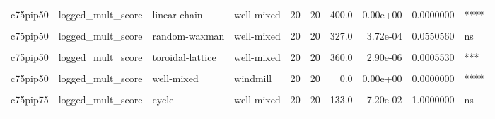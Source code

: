 \documentclass[
]{book}
\begin{document}
\begin{table}
\begin{tabular}{l|l|l|l|r|r|r|r|r|l}
\hline
\cellcolor{gray!6}{c75pip50} & \cellcolor{gray!6}{logged\_mult\_score} & \cellcolor{gray!6}{cycle} & \cellcolor{gray!6}{well-mixed} & \cellcolor{gray!6}{20} & \cellcolor{gray!6}{20} & \cellcolor{gray!6}{400.0} & \cellcolor{gray!6}{0.00e+00} & \cellcolor{gray!6}{0.0000000} & \cellcolor{gray!6}{****}\\
\hline
c75pip50 & logged\_mult\_score & linear-chain & well-mixed & 20 & 20 & 400.0 & 0.00e+00 & 0.0000000 & ****\\
\hline
\cellcolor{gray!6}{c75pip50} & \cellcolor{gray!6}{logged\_mult\_score} & \cellcolor{gray!6}{random-barabasi-albert} & \cellcolor{gray!6}{well-mixed} & \cellcolor{gray!6}{20} & \cellcolor{gray!6}{20} & \cellcolor{gray!6}{249.0} & \cellcolor{gray!6}{1.92e-01} & \cellcolor{gray!6}{1.0000000} & \cellcolor{gray!6}{ns}\\
\hline
c75pip50 & logged\_mult\_score & random-waxman & well-mixed & 20 & 20 & 327.0 & 3.72e-04 & 0.0550560 & ns\\
\hline
\cellcolor{gray!6}{c75pip50} & \cellcolor{gray!6}{logged\_mult\_score} & \cellcolor{gray!6}{star} & \cellcolor{gray!6}{well-mixed} & \cellcolor{gray!6}{20} & \cellcolor{gray!6}{20} & \cellcolor{gray!6}{400.0} & \cellcolor{gray!6}{0.00e+00} & \cellcolor{gray!6}{0.0000000} & \cellcolor{gray!6}{****}\\
\hline
c75pip50 & logged\_mult\_score & toroidal-lattice & well-mixed & 20 & 20 & 360.0 & 2.90e-06 & 0.0005530 & ***\\
\hline
\cellcolor{gray!6}{c75pip50} & \cellcolor{gray!6}{logged\_mult\_score} & \cellcolor{gray!6}{well-mixed} & \cellcolor{gray!6}{wheel} & \cellcolor{gray!6}{20} & \cellcolor{gray!6}{20} & \cellcolor{gray!6}{0.0} & \cellcolor{gray!6}{0.00e+00} & \cellcolor{gray!6}{0.0000000} & \cellcolor{gray!6}{****}\\
\hline
c75pip50 & logged\_mult\_score & well-mixed & windmill & 20 & 20 & 0.0 & 0.00e+00 & 0.0000000 & ****\\
\hline
\cellcolor{gray!6}{c75pip75} & \cellcolor{gray!6}{logged\_mult\_score} & \cellcolor{gray!6}{comet-kite} & \cellcolor{gray!6}{well-mixed} & \cellcolor{gray!6}{20} & \cellcolor{gray!6}{20} & \cellcolor{gray!6}{175.0} & \cellcolor{gray!6}{5.12e-01} & \cellcolor{gray!6}{1.0000000} & \cellcolor{gray!6}{ns}\\
\hline
c75pip75 & logged\_mult\_score & cycle & well-mixed & 20 & 20 & 133.0 & 7.20e-02 & 1.0000000 & ns\\
\hline
\cellcolor{gray!6}{c75pip75} & \cellcolor{gray!6}{logged\_mult\_score} & \cellcolor{gray!6}{linear-chain} & \cellcolor{gray!6}{well-mixed} & \cellcolor{gray!6}{20} & \cellcolor{gray!6}{20} & \cellcolor{gray!6}{101.0} & \cellcolor{gray!6}{7.00e-03} & \cellcolor{gray!6}{0.8400000} & \cellcolor{gray!6}{ns}\\

\end{tabular}
\end{table}
\end{document}
